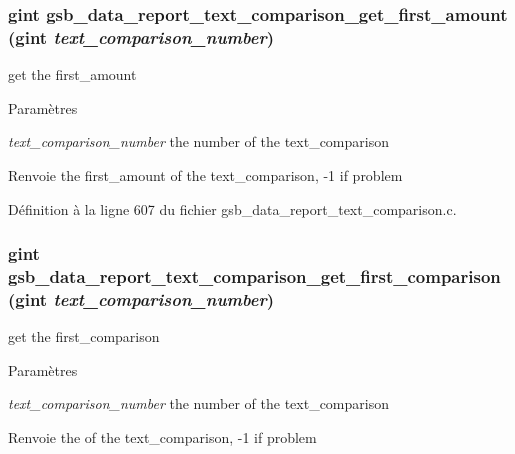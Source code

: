 \subsubsection[{gsb\_\-data\_\-report\_\-text\_\-comparison\_\-get\_\-first\_\-amount}]{\setlength{\rightskip}{0pt plus 5cm}gint gsb\_\-data\_\-report\_\-text\_\-comparison\_\-get\_\-first\_\-amount (gint {\em text\_\-comparison\_\-number})}\label{gsb__data__report__text__comparison_8h_af8a1288b302625bf680b9b1eb908af6f}
get the first\_\-amount


\begin{DoxyParams}{Paramètres}
\item[{\em text\_\-comparison\_\-number}]the number of the text\_\-comparison\end{DoxyParams}
\begin{DoxyReturn}{Renvoie}
the first\_\-amount of the text\_\-comparison, -\/1 if problem 
\end{DoxyReturn}


Définition à la ligne 607 du fichier gsb\_\-data\_\-report\_\-text\_\-comparison.c.

\subsubsection[{gsb\_\-data\_\-report\_\-text\_\-comparison\_\-get\_\-first\_\-comparison}]{\setlength{\rightskip}{0pt plus 5cm}gint gsb\_\-data\_\-report\_\-text\_\-comparison\_\-get\_\-first\_\-comparison (gint {\em text\_\-comparison\_\-number})}\label{gsb__data__report__text__comparison_8h_afe21d933d743f2a91261483b8b0b466c}
get the first\_\-comparison


\begin{DoxyParams}{Paramètres}
\item[{\em text\_\-comparison\_\-number}]the number of the text\_\-comparison\end{DoxyParams}
\begin{DoxyReturn}{Renvoie}
the of the text\_\-comparison, -\/1 if problem 
\end{DoxyReturn}


